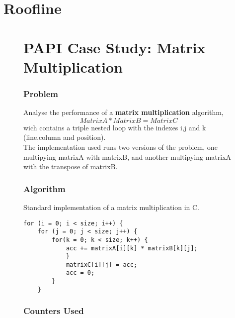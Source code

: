 \documentclass{beamer}
\begin{document}
\section{Roofline}
\begin{frame}
	\begin{figure}[!htp]
		
\section{PAPI Case Study: Matrix Multiplication}
\begin{frame}%
	\frametitle{Problem}

	Analyse the performance of a \textbf{matrix multiplication} algorithm, \begin{equation}Matrix A * Matrix B = Matrix C\end{equation} wich contains a triple nested loop with the indexes i,j and k (line,column and position).\\

	The implementation used runs two versions of the problem, one multipying matrixA with matrixB, and another multipying matrixA with the transpose of matrixB.
\end{frame}%

\begin{frame}[fragile]
	\frametitle{Algorithm}

Standard implementation of a matrix multiplication in C.

\begin{verbatim}
for (i = 0; i < size; i++) {
    for (j = 0; j < size; j++) {
        for(k = 0; k < size; k++) {
            acc += matrixA[i][k] * matrixB[k][j];				
            }		
            matrixC[i][j] = acc;	
            acc = 0;
        }
    }
\end{verbatim}
\end{frame}

\begin{frame}
	\frametitle{Counters Used}


\end{frame}
\end{figure}
\end{frame}
\end{document}
